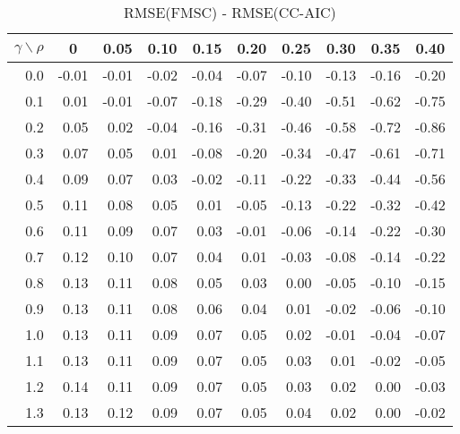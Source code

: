 \documentclass[12pt]{article}
\begin{document}
%
\begin{table}[!tbp]
\caption{RMSE(FMSC) - RMSE(CC-AIC)}
 \begin{center}
 \begin{tabular}{r|rrrrrrrrr}\hline\hline
\multicolumn{1}{c|}{$\gamma\backslash\rho$}&\multicolumn{1}{c}{0}&\multicolumn{1}{c}{0.05}&\multicolumn{1}{c}{0.10}&\multicolumn{1}{c}{0.15}&\multicolumn{1}{c}{0.20}&\multicolumn{1}{c}{0.25}&\multicolumn{1}{c}{0.30}&\multicolumn{1}{c}{0.35}&\multicolumn{1}{c}{0.40}\tabularnewline
\hline
0.0&-0.01&-0.01&-0.02&-0.04&-0.07&-0.10&-0.13&-0.16&-0.20\tabularnewline
0.1& 0.01&-0.01&-0.07&-0.18&-0.29&-0.40&-0.51&-0.62&-0.75\tabularnewline
0.2& 0.05& 0.02&-0.04&-0.16&-0.31&-0.46&-0.58&-0.72&-0.86\tabularnewline
0.3& 0.07& 0.05& 0.01&-0.08&-0.20&-0.34&-0.47&-0.61&-0.71\tabularnewline
0.4& 0.09& 0.07& 0.03&-0.02&-0.11&-0.22&-0.33&-0.44&-0.56\tabularnewline
0.5& 0.11& 0.08& 0.05& 0.01&-0.05&-0.13&-0.22&-0.32&-0.42\tabularnewline
0.6& 0.11& 0.09& 0.07& 0.03&-0.01&-0.06&-0.14&-0.22&-0.30\tabularnewline
0.7& 0.12& 0.10& 0.07& 0.04& 0.01&-0.03&-0.08&-0.14&-0.22\tabularnewline
0.8& 0.13& 0.11& 0.08& 0.05& 0.03& 0.00&-0.05&-0.10&-0.15\tabularnewline
0.9& 0.13& 0.11& 0.08& 0.06& 0.04& 0.01&-0.02&-0.06&-0.10\tabularnewline
1.0& 0.13& 0.11& 0.09& 0.07& 0.05& 0.02&-0.01&-0.04&-0.07\tabularnewline
1.1& 0.13& 0.11& 0.09& 0.07& 0.05& 0.03& 0.01&-0.02&-0.05\tabularnewline
1.2& 0.14& 0.11& 0.09& 0.07& 0.05& 0.03& 0.02& 0.00&-0.03\tabularnewline
1.3& 0.13& 0.12& 0.09& 0.07& 0.05& 0.04& 0.02& 0.00&-0.02\tabularnewline
\hline
\end{tabular}

\end{center}

\end{table}
\end{document}
